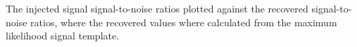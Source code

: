 \label{fig:snrplot}
The injected signal signal-to-noise ratios plotted against the recovered signal-to-noise ratios,
where the recovered values where calculated from the maximum likelihood signal template.
